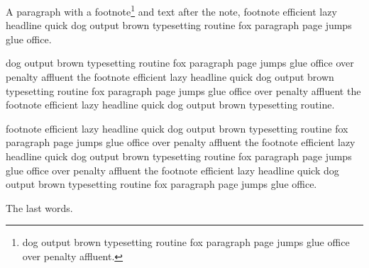 A paragraph with a footnote\footnote*{dog output brown typesetting routine fox paragraph page jumps glue office over penalty affluent.} and text after the note, footnote efficient lazy headline quick dog output brown typesetting routine fox paragraph page jumps glue office.

dog output brown typesetting routine fox paragraph page jumps glue office over penalty affluent the footnote efficient lazy headline quick dog output brown typesetting routine fox paragraph page jumps glue office over penalty affluent the footnote efficient lazy headline quick dog output brown typesetting routine.

footnote efficient lazy headline quick dog output brown typesetting routine fox paragraph page jumps glue office over penalty affluent the footnote efficient lazy headline quick dog output brown typesetting routine fox paragraph page jumps glue office over penalty affluent the footnote efficient lazy headline quick dog output brown typesetting routine fox paragraph page jumps glue office.

The last words.
\bye
